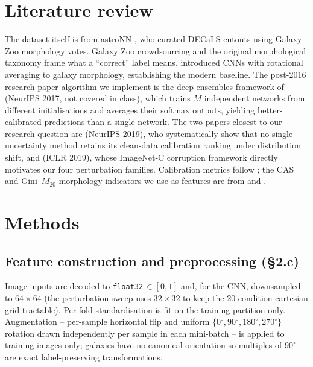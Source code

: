 \documentclass[10pt,a4paper]{article}
\begin{document}
\section{Literature review}
The dataset itself is from astroNN \citep{leung2019}, who curated DECaLS cutouts using Galaxy Zoo morphology votes. Galaxy Zoo crowdsourcing \citep{lintott2008} and the original morphological taxonomy frame what a ``correct'' label means. \citet{dieleman2015} introduced CNNs with rotational averaging to galaxy morphology, establishing the modern baseline. The post-2016 research-paper algorithm we implement is the deep-ensembles framework of \citet{lakshminarayanan2017} (NeurIPS 2017, not covered in class), which trains $M$ independent networks from different initialisations and averages their softmax outputs, yielding better-calibrated predictions than a single network. The two papers closest to our research question are \citet{ovadia2019} (NeurIPS 2019), who systematically show that no single uncertainty method retains its clean-data calibration ranking under distribution shift, and \citet{hendrycks2019} (ICLR 2019), whose ImageNet-C corruption framework directly motivates our four perturbation families. Calibration metrics follow \citet{guo2017}; the CAS and Gini--$M_{20}$ morphology indicators we use as features are from \citet{conselice2003} and \citet{lotz2004}.

\section{Methods}
\subsection{Feature construction and preprocessing (\S 2.c)}
Image inputs are decoded to \texttt{float32}\,$\in[0,1]$ and, for the CNN, downsampled to $64\!\times\!64$ (the perturbation sweep uses $32\!\times\!32$ to keep the 20-condition cartesian grid tractable). Per-fold standardisation is fit on the training partition only. Augmentation -- per-sample horizontal flip and uniform $\{0^\circ,90^\circ,180^\circ,270^\circ\}$ rotation drawn independently per sample in each mini-batch -- is applied to training images only; galaxies have no canonical orientation so multiples of $90^\circ$ are exact label-preserving transformations.
\end{document}
